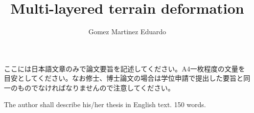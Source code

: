 \documentclass[uplatex,dvipdfmx,a4paper]{jsarticle}
\begin{document}


\doctorthesisEN %

\title{Multi-layered terrain deformation}
\fisicalyear{ \currentfisicalyear}
\author{Gomez Martinez Eduardo} %

\maketitle

\setcounter{page}{1} %

ここには日本語文章のみで論文要旨を記述してください。A4一枚程度の文量を目安としてください。なお修士、博士論文の場合は学位申請で提出した要旨と同一のものでなければなりませんので注意してください。

The author shall describe his/her thesis in English text. 150 words.
\end{document}
